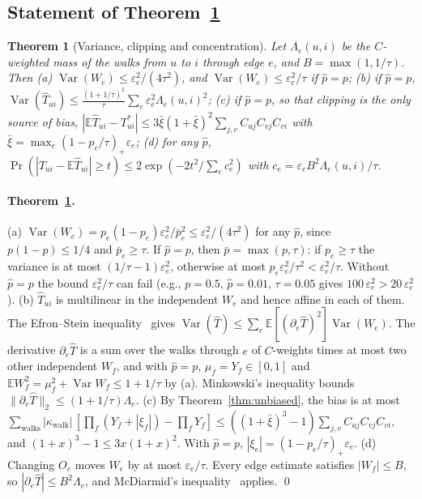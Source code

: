 \documentclass[preprint,review,12pt,authoryear]{elsarticle}
\newtheorem{theorem}{Theorem}
\theoremstyle{definition}
\newcommand{\E}{\mathbb{E}}
\newcommand{\Var}{\operatorname{Var}}
\begin{document}
\subsection*{Statement of Theorem~\ref{thm:var}}
\begin{theorem}[Variance, clipping and concentration]\label{thm:var}
Let $\Lambda_e(u,i)$ be the $C$-weighted mass of the walks from $u$ to $i$ through
edge $e$, and $B=\max(1,1/\tau)$. Then
(a) $\Var(W_e)\le\varepsilon_e^2/(4\tau^2)$, and $\Var(W_e)\le\varepsilon_e^2/\tau$ if $\hat p=p$;
(b) if $\hat p=p$, $\Var(\hat T_{ui})\le\frac{(1+1/\tau)^2}{\tau}\sum_e\varepsilon_e^2\Lambda_e(u,i)^2$;
(c) if $\hat p=p$, so that clipping is the only source of bias,
$|\E\hat T_{ui}-T^*_{ui}|\le3\bar\xi(1+\bar\xi)^2\sum_{j,v}C_{uj}C_{vj}C_{vi}$ with
$\bar\xi=\max_e(1-p_e/\tau)_+\varepsilon_e$;
(d) for any $\hat p$, $\Pr(|\hat T_{ui}-\E\hat T_{ui}|\ge t)\le2\exp(-2t^2/\sum_ec_e^2)$ with
$c_e=\varepsilon_eB^2\Lambda_e(u,i)/\tau$.
\end{theorem}

\paragraph{Theorem~\ref{thm:var}.}
(a) $\Var(W_e)=p_e(1-p_e)\varepsilon_e^2/\bar p_e^2\le\varepsilon_e^2/(4\tau^2)$ for any $\hat p$,
since $p(1-p)\le1/4$ and $\bar p_e\ge\tau$. If $\hat p=p$, then $\bar p=\max(p,\tau)$: if
$p_e\ge\tau$ the variance is at most $(1/\tau-1)\varepsilon_e^2$, otherwise at most
$p_e\varepsilon_e^2/\tau^2<\varepsilon_e^2/\tau$. Without $\hat p=p$ the bound $\varepsilon_e^2/\tau$ can
fail (e.g., $p=0.5$, $\hat p=0.01$, $\tau=0.05$ gives $100\,\varepsilon_e^2>20\,\varepsilon_e^2$).
(b) $\hat T_{ui}$ is multilinear in the independent $W_e$ and hence affine in each
of them. The Efron--Stein inequality~\citep{efron1981jackknife} gives
$\Var(\hat T)\le\sum_e\E[(\partial_e\hat T)^2]\Var(W_e)$. The derivative $\partial_e\hat T$
is a sum over the walks through $e$ of $C$-weights times at most two other
independent $W_f$, and with $\hat p=p$, $\mu_f=Y_f\in[0,1]$ and
$\E W_f^2=\mu_f^2+\Var W_f\le1+1/\tau$ by (a). Minkowski's
inequality bounds $\|\partial_e\hat T\|_2\le(1+1/\tau)\Lambda_e$.
(c) By Theorem~\ref{thm:unbiased}, the bias is at most
$\sum_{\text{walks}}|\kappa_{\text{walk}}|\,[\prod_f(Y_f+|\xi_f|)-\prod_fY_f]\le((1+\bar\xi)^3-1)\sum_{j,v}C_{uj}C_{vj}C_{vi}$,
and $(1+x)^3-1\le3x(1+x)^2$. With $\hat p=p$, $|\xi_e|=(1-p_e/\tau)_+\varepsilon_e$.
(d) Changing $O_e$ moves $W_e$ by at most $\varepsilon_e/\tau$. Every edge estimate
satisfies $|W_f|\le B$, so $|\partial_e\hat T|\le B^2\Lambda_e$, and McDiarmid's
inequality~\citep{mcdiarmid1989} applies. \qed
\end{document}
